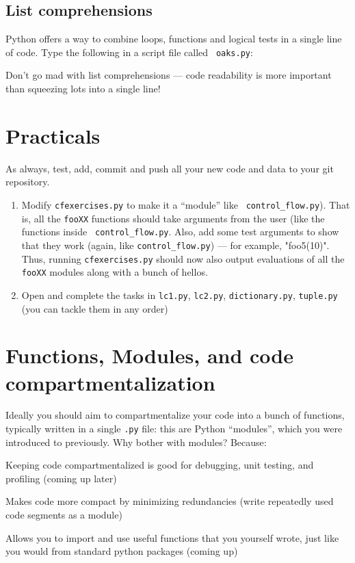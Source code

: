 \subsection{List comprehensions}

Python offers a way to combine loops, functions and logical tests in a 
single line of code. Type the following in a script file called {\tt 
oaks.py}:



Don't go mad with list comprehensions --- code readability is more 
important than squeezing lots into a single line! 

\section{Practicals}
As always, test, add, commit and push all your new code and data to 
your git repository. 

\begin{enumerate}

	\item Modify {\tt cfexercises.py} to make it a ``module'' like {\tt 
	control\_flow.py}). That is, all the {\tt fooXX} functions should 
	take arguments from the user (like the functions inside {\tt 
	control\_flow.py}. Also, add some test arguments to show that they 
	work (again, like {\tt control\_flow.py}) --- for example, 
	"foo5(10)". Thus, running {\tt cfexercises.py} should now also output 
	evaluations of all the {\tt fooXX} modules along with a bunch of 
	hellos.

	\item Open and complete the tasks in {\tt lc1.py}, 
	{\tt lc2.py}, {\tt dictionary.py}, {\tt tuple.py} (you can tackle 
	them in any order) 

\end{enumerate}

\section{Functions, Modules, and code compartmentalization}
 
 Ideally you should aim to compartmentalize your code into a bunch of 
 functions, typically written in a single {\tt .py} file: this are  
 Python ``modules'', which you were introduced to previously. Why bother 
 with modules? Because:

\begin{compactitem}
 
	\item Keeping code compartmentalized  is good for debugging, unit
  testing, and profiling (coming up later)
	\item Makes code more compact by minimizing redundancies (write
  repeatedly used code segments as a module)
	\item Allows you to import and use useful functions that you yourself
wrote, just like you would from standard python packages (coming up)
      \end{compactitem}

